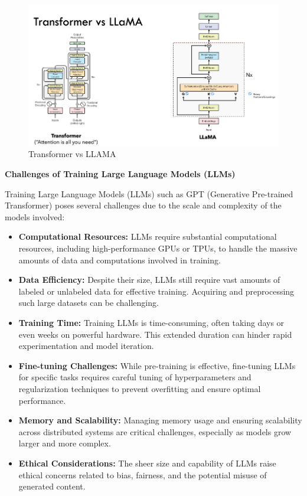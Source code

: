 \begin{figure}[h!]
	\centering
	\includegraphics[scale=0.5]{figures/llama.png}
	\caption{Transformer vs LLAMA }
\end{figure}

\hfill \break
\textbf{Challenges of Training Large Language Models (LLMs)}

Training Large Language Models (LLMs) such as GPT (Generative Pre-trained Transformer) poses several challenges due to the scale and complexity of the models involved:

\begin{itemize}
    \item \textbf{Computational Resources:} LLMs require substantial computational resources, including high-performance GPUs or TPUs, to handle the massive amounts of data and computations involved in training.
    
    \item \textbf{Data Efficiency:} Despite their size, LLMs still require vast amounts of labeled or unlabeled data for effective training. Acquiring and preprocessing such large datasets can be challenging.
    
    \item \textbf{Training Time:} Training LLMs is time-consuming, often taking days or even weeks on powerful hardware. This extended duration can hinder rapid experimentation and model iteration.
    
    \item \textbf{Fine-tuning Challenges:} While pre-training is effective, fine-tuning LLMs for specific tasks requires careful tuning of hyperparameters and regularization techniques to prevent overfitting and ensure optimal performance.
    
    \item \textbf{Memory and Scalability:} Managing memory usage and ensuring scalability across distributed systems are critical challenges, especially as models grow larger and more complex.
    
    \item \textbf{Ethical Considerations:} The sheer size and capability of LLMs raise ethical concerns related to bias, fairness, and the potential misuse of generated content.
\end{itemize}

